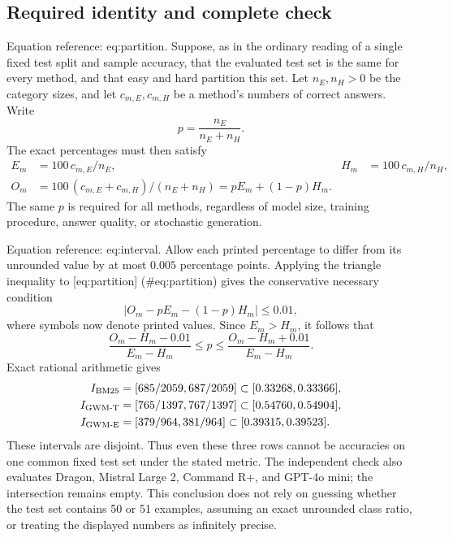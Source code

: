 \documentclass[10pt]{article}
\begin{document}
\subsection*{Required identity and complete check}
Equation reference: eq:partition. Suppose, as in the ordinary reading of a single fixed test split and sample accuracy, that the evaluated test set is the same for every method, and that easy and hard partition this set. Let \(n_E,n_H>0\) be the category sizes, and let \(c_{m,E},c_{m,H}\) be a method’s numbers of correct answers. Write \[p=\frac{n_E}{n_E+n_H}.\] The exact percentages must then satisfy \[\begin{aligned}
 E_m&=100\,c_{m,E}/n_E, &
 H_m&=100\,c_{m,H}/n_H,\\
 O_m&=100\,(c_{m,E}+c_{m,H})/(n_E+n_H)
     =pE_m+(1-p)H_m.                     \end{aligned}\] The same \(p\) is required for all methods, regardless of model size, training procedure, answer quality, or stochastic generation.\par
Equation reference: eq:interval. Allow each printed percentage to differ from its unrounded value by at most \(0.005\) percentage points. Applying the triangle inequality to [eq:partition] (\#eq:partition) gives the conservative necessary condition \[\left|O_m-pE_m-(1-p)H_m\right|\leq 0.01,\] where symbols now denote printed values. Since \(E_m>H_m\), it follows that \[\frac{O_m-H_m-0.01}{E_m-H_m}
 \leq p \leq
 \frac{O_m-H_m+0.01}{E_m-H_m}.             \] Exact rational arithmetic gives \[\begin{aligned}
 I_{\rm BM25}
   &= [685/2059,687/2059]
     \subset [0.33268,0.33366],\\
 I_{\rm GWM\text{-}T}
   &= [765/1397,767/1397]
     \subset [0.54760,0.54904],\\
 I_{\rm GWM\text{-}E}
   &= [379/964,381/964]
     \subset [0.39315,0.39523].\end{aligned}\] These intervals are disjoint. Thus even these three rows cannot be accuracies on one common fixed test set under the stated metric. The independent check also evaluates Dragon, Mistral Large 2, Command R+, and GPT-4o mini; the intersection remains empty. This conclusion does not rely on guessing whether the test set contains 50 or 51 examples, assuming an exact unrounded class ratio, or treating the displayed numbers as infinitely precise.\par
\end{document}
